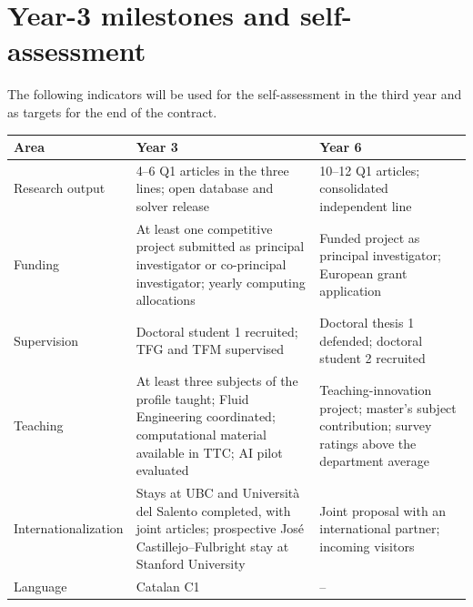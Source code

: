 \documentclass[11pt]{article}
\begin{document}
\section{Year-3 milestones and self-assessment}
The following indicators will be used for the self-assessment in the third year and as
targets for the end of the contract.
\begin{center}\small
\begin{tabularx}{\textwidth}{@{}p{3.0cm}XX@{}}
\toprule
\textbf{Area} & \textbf{Year 3} & \textbf{Year 6} \\
\midrule
Research output & 4--6 Q1 articles in the three lines; open database and solver release & 10--12 Q1 articles; consolidated independent line \\
Funding & At least one competitive project submitted as principal investigator or co-principal investigator; yearly computing allocations & Funded project as principal investigator; European grant application \\
Supervision & Doctoral student 1 recruited; TFG and TFM supervised & Doctoral thesis 1 defended; doctoral student 2 recruited \\
Teaching & At least three subjects of the profile taught; Fluid Engineering coordinated; computational material available in TTC; AI pilot evaluated & Teaching-innovation project; master's subject contribution; survey ratings above the department average \\
Internationalization & Stays at UBC and Universit\`a del Salento completed, with joint articles; prospective Jos\'e Castillejo--Fulbright stay at Stanford University & Joint proposal with an international partner; incoming visitors \\
Language & Catalan C1 & -- \\
\bottomrule
\end{tabularx}
\end{center}
\end{document}
